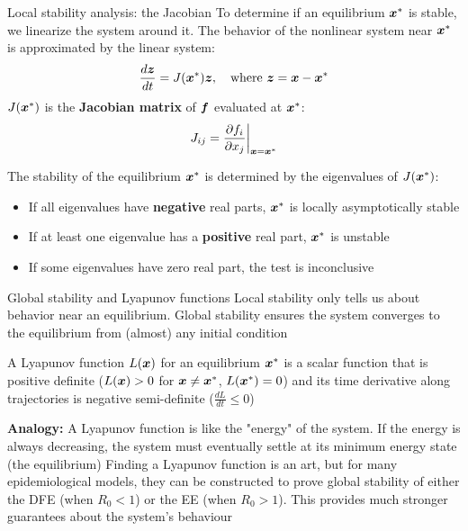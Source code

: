 \documentclass[aspectratio=169]{beamer}\usepackage[]{graphicx}\usepackage[]{xcolor}
\begin{document}
\begin{frame}{Local stability analysis: the Jacobian}
    To determine if an equilibrium $\bm{x}^*$ is stable, we linearize the system around it.
    The behavior of the nonlinear system near $\bm{x}^*$ is approximated by the linear system:
    $$ \frac{d\bm{z}}{dt} = J(\bm{x}^*) \bm{z}, \quad \text{where } \bm{z} = \bm{x} - \bm{x}^* $$
    $J(\bm{x}^*)$ is the \textbf{Jacobian matrix} of $\bm{f}$ evaluated at $\bm{x}^*$:
    $$ J_{ij} = \frac{\partial f_i}{\partial x_j} \bigg|_{\bm{x}=\bm{x}^*} $$
    \begin{theorem}
        The stability of the equilibrium $\bm{x}^*$ is determined by the eigenvalues of $J(\bm{x}^*)$:
        \begin{itemize}
            \item If all eigenvalues have \textbf{negative} real parts, $\bm{x}^*$ is locally asymptotically stable
            \item If at least one eigenvalue has a \textbf{positive} real part, $\bm{x}^*$ is unstable
            \item If some eigenvalues have zero real part, the test is inconclusive
        \end{itemize}
    \end{theorem}
\end{frame}

\begin{frame}{Global stability and Lyapunov functions}
    Local stability only tells us about behavior near an equilibrium. Global stability ensures the system converges to the equilibrium from (almost) any initial condition
    \begin{definition}
        A Lyapunov function $L(\bm{x})$ for an equilibrium $\bm{x}^*$ is a scalar function that is positive definite ($L(\bm{x})>0$ for $\bm{x}\neq\bm{x}^*$, $L(\bm{x}^*)=0$) and its time derivative along trajectories is negative semi-definite ($\frac{dL}{dt} \le 0$)
    \end{definition}
    \textbf{Analogy:} A Lyapunov function is like the "energy" of the system. If the energy is always decreasing, the system must eventually settle at its minimum energy state (the equilibrium)
    \vfill
    Finding a Lyapunov function is an art, but for many epidemiological models, they can be constructed to prove global stability of either the DFE (when $R_0 < 1$) or the EE (when $R_0 > 1$). This provides much stronger guarantees about the system's behaviour
\end{frame}
\end{document}
